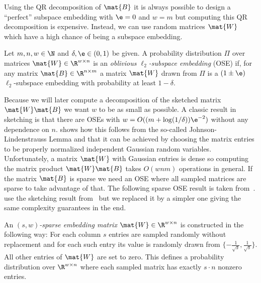 Using the QR decomposition of \(\mat{B}\) it is always possible to design a \enquote{perfect} subspace embedding with \(\e = 0\) and \(w = m\)
but computing this QR decomposition is expensive.
Instead, we can use random matrices \(\mat{W}\) which have a high chance of being a subspace embedding.

\begin{definition}\label{def:oblivious-subspace-embedding}
Let \(m, n, w \in \N\) and \(\delta, \e \in (0, 1)\) be given.
A probability distribution \(\Pi\) over matrices \(\mat{W} \in \R^{w \times n}\) is an \emph{oblivious \(\ell_2\)-subspace embedding} (OSE) if, for any matrix \(\mat{B} \in \R^{n \times m}\) a matrix \(\mat{W}\) drawn from \(\Pi\) is a \((1\pm\e)\) \(\ell_2\)-subspace embedding with probability at least \(1 - \delta\).
\end{definition}

Because we will later compute a decomposition of the sketched matrix \(\mat{W}\mat{B}\) we want \(w\) to be as small as possible.
A classic result in sketching is that there are OSEs with \(w = O((m + \log(1/\delta))\e^{-2})\) without any dependence on \(n\).
\Textcite[Theorem 6]{Woodruff-Sketching} shows how this follows from the so-called Johnson-Lindenstrauss Lemma and that it can be achieved by choosing the matrix entries to be properly normalized independent Gaussian random variables.
Unfortunately, a matrix \(\mat{W}\) with Gaussian entries is dense so computing the matrix product \(\mat{W}\mat{B}\) takes \(O(w n m)\) operations in general.
If the matrix \(\mat{B}\) is sparse we need an OSE where all sampled matrices are sparse to take advantage of that.
The following sparse OSE result is taken from~\cite{Cohen-NearlyTightObliviousSubspaceEmbeddings}.
\Textcite{Avron-FasterRandomizedInfeasibleIPMs} use the sketching result from~\cite{Cohen-OptimalApproximateMatrixProduct} but we replaced it by a simpler one giving the same complexity guarantees in the end.

\begin{definition}
An \emph{\((s, w)\)-sparse embedding matrix} \(\mat{W} \in \R^{w \times n}\) is constructed in the following way:
For each column \(s\) entries are sampled randomly without replacement and for each such entry its value is randomly drawn from \(\{ - \frac{1}{\sqrt{s}}, \frac{1}{\sqrt{s}} \}\).
All other entries of \(\mat{W}\) are set to zero.
This defines a probability distribution over \(\R^{w \times n}\) where each sampled matrix has exactly \(s \cdot n\) nonzero entries.
\end{definition}

